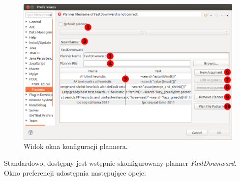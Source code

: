 \newpage
\begin{figure}[h!]
    \centering
    \includegraphics[width=\textwidth]{img/planner_preferences_window}
    \caption{Widok okna konfiguracji plannera.}
    \label{fig:preferences_window}
\end{figure}
Standardowo, dostępny jest wstępnie skonfigurowany planner \textit{FastDownward}. Okno preferencji udostępnia następujące opcje:
